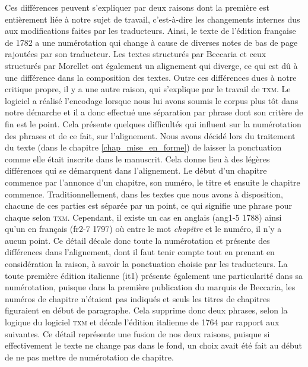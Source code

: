 Ces différences peuvent s’expliquer par deux raisons dont la première est entièrement liée à notre sujet de travail, c’est-à-dire les changements internes dus aux modifications faites par les traducteurs. Ainsi, le texte de l’édition française de 1782 a une numérotation qui change à cause de diverses notes de bas de page rajoutées par son traducteur. Les textes structurés par Beccaria et ceux structurés par Morellet ont également un alignement qui diverge, ce qui est dû à une différence dans la composition des textes. Outre ces différences dues à notre critique propre, il y a une autre raison, qui s’explique par le travail de \textsc{txm}. Le logiciel a réalisé l’encodage lorsque nous lui avons soumis le corpus plus tôt dans notre démarche et il a donc effectué une séparation par phrase dont son critère de fin est le point. Cela présente quelques difficultés qui influent sur la numérotation des phrases et de ce fait, sur l’alignement. Nous avons décidé lors du traitement du texte (dans le chapitre \ref{chap_mise_en_forme}) de laisser la ponctuation comme elle était inscrite dans le manuscrit. Cela donne lieu à des légères différences qui se démarquent dans l’alignement. Le début d’un chapitre commence par l’annonce d’un chapitre, son numéro, le titre et ensuite le chapitre commence. Traditionnellement, dans les textes que nous avons à disposition, chacune de ces parties est séparée par un point, ce qui signifie une phrase pour chaque selon \textsc{txm}. Cependant, il existe un cas en anglais (ang1-5 1788) ainsi qu’un en français (fr2-7 1797) où entre le mot \textit{chapitre} et le numéro, il n’y a aucun point. Ce détail décale donc toute la numérotation et présente des différences dans l’alignement, dont il faut tenir compte tout en prenant en considération la raison, à savoir la ponctuation choisie par les traducteurs. La toute première édition italienne (it1) présente également une particularité dans sa numérotation, puisque dans la première publication du marquis de Beccaria, les numéros de chapitre n’étaient pas indiqués et seuls les titres de chapitres figuraient en début de paragraphe. Cela supprime donc deux phrases, selon la logique du logiciel \textsc{txm} et décale l’édition italienne de 1764 par rapport aux suivantes. Ce détail représente une fusion de nos deux raisons, puisque si effectivement le texte ne change pas dans le fond, un choix avait été fait au début de ne pas mettre de numérotation de chapitre. 

